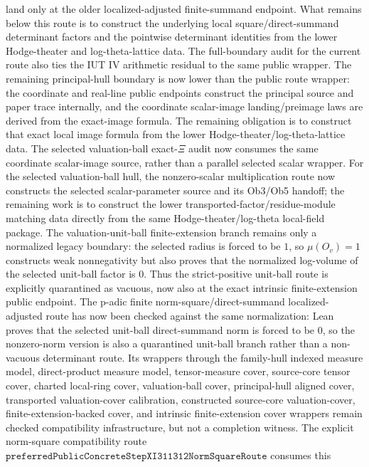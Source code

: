 \documentclass[11pt]{article}
\theoremstyle{plain}
\theoremstyle{definition}
\theoremstyle{remark}
\begin{document}
  land only at the older localized-adjusted finite-summand endpoint.  What remains
  below this route is to construct the underlying local square/direct-summand
  determinant factors and the pointwise determinant identities from the lower
  Hodge-theater and log-theta-lattice data.  The
  full-boundary audit for the current route also ties the
  IUT IV arithmetic residual to the same public wrapper.  The remaining
  principal-hull boundary is now lower than the public route wrapper: the
  coordinate and real-line public endpoints construct the principal source and
  paper trace internally, and the coordinate scalar-image landing/preimage
  laws are derived from the exact-image formula.  The remaining obligation is
  to construct that exact local image formula from the lower
  Hodge-theater/log-theta-lattice data.  The selected valuation-ball
  exact-\(\Xi\) audit now consumes the same coordinate scalar-image source,
  rather than a parallel selected scalar wrapper.  For the selected valuation-ball
  hull, the nonzero-scalar multiplication route now constructs the selected
  scalar-parameter source and its Ob3/Ob5 handoff; the remaining work is to
  construct the lower transported-factor/residue-module matching data directly
  from the same Hodge-theater/log-theta local-field package.
The valuation-unit-ball finite-extension branch remains only a normalized
legacy boundary: the selected radius is forced to be \(1\), so \(\mu(O_v)=1\)
constructs weak nonnegativity but also proves that the normalized log-volume
of the selected unit-ball factor is \(0\).  Thus the strict-positive
unit-ball route is explicitly quarantined as vacuous, now also at the exact
intrinsic finite-extension public endpoint.  The p-adic finite
norm-square/direct-summand localized-adjusted route has now been checked
against the same normalization: Lean proves that the selected unit-ball
direct-summand norm is forced to be \(0\), so the nonzero-norm version is
also a quarantined unit-ball branch rather than a non-vacuous determinant
route.  Its wrappers through the family-hull indexed measure model,
direct-product measure model, tensor-measure cover, source-core tensor cover,
charted local-ring cover, valuation-ball cover, principal-hull aligned cover,
transported valuation-cover calibration, constructed source-core
valuation-cover, finite-extension-backed cover, and intrinsic finite-extension
cover wrappers remain checked compatibility infrastructure, but not a
completion witness.  The explicit norm-square compatibility route
\(\texttt{preferredPublicConcreteStepXI311312NormSquareRoute}\) consumes this
\end{document}
